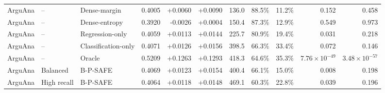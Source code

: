 \begin{table}[!htbp]
\begin{tabular}{lllrrrrrrrr}
ArguAna & -- & Dense-margin & 0.4005 & +0.0060 & +0.0090 & 136.0 & 88.5\% & 11.2\% & 0.152 & 0.458 \\
ArguAna & -- & Dense-entropy & 0.3920 & -0.0026 & +0.0004 & 150.4 & 87.3\% & 12.9\% & 0.549 & 0.973 \\
ArguAna & -- & Regression-only & 0.4059 & +0.0113 & +0.0144 & 225.7 & 80.9\% & 19.4\% & 0.031 & 0.218 \\
ArguAna & -- & Classification-only & 0.4071 & +0.0126 & +0.0156 & 398.5 & 66.3\% & 33.4\% & 0.072 & 0.146 \\
ArguAna & -- & Oracle & 0.5209 & +0.1263 & +0.1293 & 418.3 & 64.6\% & 35.3\% & $7.76\!\times\!10^{-49}$ & $3.48\!\times\!10^{-57}$ \\
ArguAna & Balanced & B-P-SAFE & 0.4069 & +0.0123 & +0.0154 & 400.4 & 66.1\% & 15.0\% & 0.008 & 0.198 \\
ArguAna & High recall & B-P-SAFE & 0.4064 & +0.0118 & +0.0148 & 469.1 & 60.3\% & 22.8\% & 0.039 & 0.196 \\
\bottomrule
\end{tabular}
\end{table}
